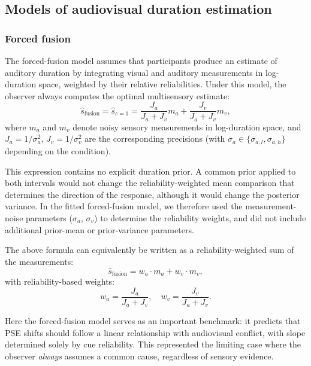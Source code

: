 \documentclass{jov}
\begin{document}
\subsection{Models of audiovisual duration estimation}

\subsubsection{Forced fusion}\label{mandatoryFusion}

The forced-fusion model assumes that participants produce an estimate of auditory duration by integrating visual and auditory measurements in log-duration space, weighted by their relative reliabilities. Under this model, the observer always computes the optimal multisensory estimate:
\begin{equation}
\label{eq:forced_fusion}
\hat{s}_{\text{fusion}} = \hat{s}_{c=1} = \frac{J_a}{J_a + J_v} m_a + \frac{J_v}{J_a + J_v} m_v,
\end{equation}
where $m_a$ and $m_v$ denote noisy sensory measurements in log-duration space, and $J_a = 1/\sigma_a^2$, $J_v = 1/\sigma_v^2$ are the corresponding precisions (with $\sigma_a \in \{\sigma_{a,l}, \sigma_{a,h}\}$ depending on the condition).


This expression contains no explicit duration prior. A common prior applied to both intervals would not change the reliability-weighted mean comparison that determines the direction of the response, although it would change the posterior variance. In the fitted forced-fusion model, we therefore used the measurement-noise parameters ($\sigma_a$, $\sigma_v$) to determine the reliability weights, and did not include additional prior-mean or prior-variance parameters.



The above formula can equivalently be written as a reliability-weighted sum of the measurements:
\begin{equation}
\hat{s}_{\text{fusion}} = w_a \cdot m_a + w_v \cdot m_v,
\end{equation}
with reliability-based weights:
\begin{equation}
w_a = \frac{J_a}{J_a + J_v}, \quad w_v = \frac{J_v}{J_a + J_v}.
\end{equation}

Here the forced-fusion model serves as an important benchmark: it predicts that PSE shifts should follow a linear relationship with audiovisual conflict, with slope determined solely by cue reliability. This represented the limiting case where the observer \textit{always} assumes a common cause, regardless of sensory evidence. 
\end{document}
